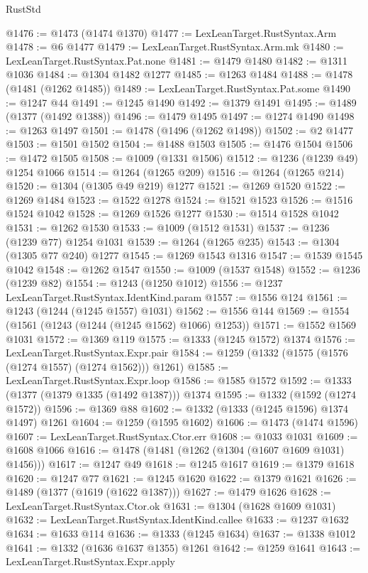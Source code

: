\begin{lexlean}{RustStd}
\begin{coremodule}
{\begin{coremodule}
{{{{{{{{{{{{{{{{{{{{{{{{{{{{{{{{{{{@1476 := @1473 (@1474 @1370)
@1477 := LexLeanTarget.RustSyntax.Arm
@1478 := @6 @1477
@1479 := LexLeanTarget.RustSyntax.Arm.mk
@1480 := LexLeanTarget.RustSyntax.Pat.none
@1481 := @1479 @1480
@1482 := @1311 @1036
@1484 := @1304 @1482 @1277
@1485 := @1263 @1484
@1488 := @1478 (@1481 (@1262 @1485))
@1489 := LexLeanTarget.RustSyntax.Pat.some
@1490 := @1247 @44
@1491 := @1245 @1490
@1492 := @1379 @1491
@1495 := @1489 (@1377 (@1492 @1388))
@1496 := @1479 @1495
@1497 := @1274 @1490
@1498 := @1263 @1497
@1501 := @1478 (@1496 (@1262 @1498))
@1502 := @2 @1477
@1503 := @1501 @1502
@1504 := @1488 @1503
@1505 := @1476 @1504
@1506 := @1472 @1505
@1508 := @1009 (@1331 @1506)
@1512 := @1236 (@1239 @49) @1254 @1066
@1514 := @1264 (@1265 @209)
@1516 := @1264 (@1265 @214)
@1520 := @1304 (@1305 @49 @219) @1277
@1521 := @1269 @1520
@1522 := @1269 @1484
@1523 := @1522 @1278
@1524 := @1521 @1523
@1526 := @1516 @1524 @1042
@1528 := @1269 @1526 @1277
@1530 := @1514 @1528 @1042
@1531 := @1262 @1530
@1533 := @1009 (@1512 @1531)
@1537 := @1236 (@1239 @77) @1254 @1031
@1539 := @1264 (@1265 @235)
@1543 := @1304 (@1305 @77 @240) @1277
@1545 := @1269 @1543 @1316
@1547 := @1539 @1545 @1042
@1548 := @1262 @1547
@1550 := @1009 (@1537 @1548)
@1552 := @1236 (@1239 @82)
@1554 := @1243 (@1250 @1012)
@1556 := @1237 LexLeanTarget.RustSyntax.IdentKind.param
@1557 := @1556 @124
@1561 := @1243 (@1244 (@1245 @1557) @1031)
@1562 := @1556 @144
@1569 := @1554 (@1561 (@1243 (@1244 (@1245 @1562) @1066) @1253))
@1571 := @1552 @1569 @1031
@1572 := @1369 @119
@1575 := @1333 (@1245 @1572) @1374
@1576 := LexLeanTarget.RustSyntax.Expr.pair
@1584 := @1259 (@1332 (@1575 (@1576 (@1274 @1557) (@1274 @1562))) @1261)
@1585 := LexLeanTarget.RustSyntax.Expr.loop
@1586 := @1585 @1572
@1592 := @1333 (@1377 (@1379 @1335 (@1492 @1387))) @1374
@1595 := @1332 (@1592 (@1274 @1572))
@1596 := @1369 @88
@1602 := @1332 (@1333 (@1245 @1596) @1374 @1497) @1261
@1604 := @1259 (@1595 @1602)
@1606 := @1473 (@1474 @1596)
@1607 := LexLeanTarget.RustSyntax.Ctor.err
@1608 := @1033 @1031
@1609 := @1608 @1066
@1616 := @1478 (@1481 (@1262 (@1304 (@1607 @1609 @1031) @1456)))
@1617 := @1247 @49
@1618 := @1245 @1617
@1619 := @1379 @1618
@1620 := @1247 @77
@1621 := @1245 @1620
@1622 := @1379 @1621
@1626 := @1489 (@1377 (@1619 (@1622 @1387)))
@1627 := @1479 @1626
@1628 := LexLeanTarget.RustSyntax.Ctor.ok
@1631 := @1304 (@1628 @1609 @1031)
@1632 := LexLeanTarget.RustSyntax.IdentKind.callee
@1633 := @1237 @1632
@1634 := @1633 @114
@1636 := @1333 (@1245 @1634)
@1637 := @1338 @1012
@1641 := @1332 (@1636 @1637 @1355) @1261
@1642 := @1259 @1641
@1643 := LexLeanTarget.RustSyntax.Expr.apply
}}}}}}}}}}}}}}}}}}}}}}}}}}}}}}}}}}}
\end{coremodule}}
\end{coremodule}
\end{lexlean}
